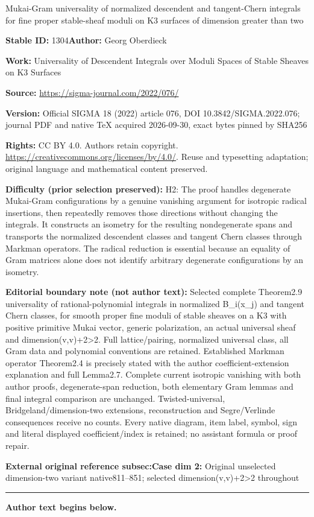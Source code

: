 \documentclass[11pt]{article}
\numberwithin{equation}{section}
\numberwithin{equation}{section}
\newcommand{\1}{\mathsf{1}}
\begin{document}
\begin{center}\Large Mukai-Gram universality of normalized descendent and tangent-Chern integrals for fine proper stable-sheaf moduli on K3 surfaces of dimension greater than two\end{center}
\noindent\textbf{Stable ID:} 1304\quad\textbf{Author:} Georg Oberdieck\par
\noindent\textbf{Work:} Universality of Descendent Integrals over Moduli Spaces of Stable Sheaves on K3 Surfaces\par
\noindent\textbf{Source:} \url{https://sigma-journal.com/2022/076/}\par
\noindent\textbf{Version:} Official SIGMA 18 (2022) article 076, DOI 10.3842/SIGMA.2022.076; journal PDF and native TeX acquired 2026-09-30, exact bytes pinned by SHA256\par
\noindent\textbf{Rights:} CC BY 4.0. Authors retain copyright. \url{https://creativecommons.org/licenses/by/4.0/}. Reuse and typesetting adaptation; original language and mathematical content preserved.\par
\noindent\textbf{Difficulty (prior selection preserved):} {\CJKfont H2: The proof handles degenerate Mukai-Gram configurations by a genuine vanishing argument for isotropic radical insertions, then repeatedly removes those directions without changing the integrals. It constructs an isometry for the resulting nondegenerate spans and transports the normalized descendent classes and tangent Chern classes through Markman operators. The radical reduction is essential because an equality of Gram matrices alone does not identify arbitrary degenerate configurations by an isometry.}\par
\medskip\noindent\textbf{Editorial boundary note (not author text):} Selected complete Theorem2.9 universality of rational-polynomial integrals in normalized B\_i(x\_j) and tangent Chern classes, for smooth proper fine moduli of stable sheaves on a K3 with positive primitive Mukai vector, generic polarization, an actual universal sheaf and dimension(v,v)+2>2. Full lattice/pairing, normalized universal class, all Gram data and polynomial conventions are retained. Established Markman operator Theorem2.4 is precisely stated with the author coefficient-extension explanation and full Lemma2.7. Complete current isotropic vanishing with both author proofs, degenerate-span reduction, both elementary Gram lemmas and final integral comparison are unchanged. Twisted-universal, Bridgeland/dimension-two extensions, reconstruction and Segre/Verlinde consequences receive no counts. Every native diagram, item label, symbol, sign and literal displayed coefficient/index is retained; no assistant formula or proof repair.\par
\noindent\textbf{External original reference subsec:Case dim 2:} Original unselected dimension-two variant native811–851; selected dimension(v,v)+2>2 throughout\par
\medskip\hrule\medskip\noindent\textbf{Author text begins below.}\par
\setcounter{section}{1}\setcounter{footnote}{1}
\end{document}
